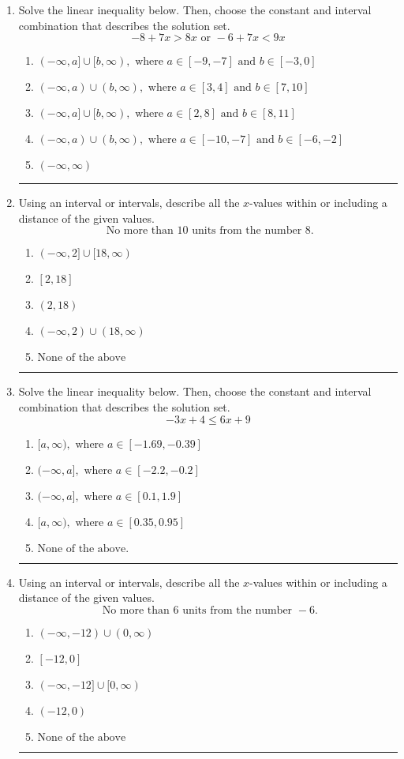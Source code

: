 \documentclass[14pt]{extbook}
\newcommand{\litem}[1]{\item#1\hspace*{-1cm}\rule{\textwidth}{0.4pt}}
\begin{document}
\begin{enumerate}
\litem{
Solve the linear inequality below. Then, choose the constant and interval combination that describes the solution set.\[ -8 + 7 x > 8 x \text{ or } -6 + 7 x < 9 x \]\begin{enumerate}[label=\Alph*.]
\item \( (-\infty, a] \cup [b, \infty), \text{ where } a \in [-9, -7] \text{ and } b \in [-3, 0] \)
\item \( (-\infty, a) \cup (b, \infty), \text{ where } a \in [3, 4] \text{ and } b \in [7, 10] \)
\item \( (-\infty, a] \cup [b, \infty), \text{ where } a \in [2, 8] \text{ and } b \in [8, 11] \)
\item \( (-\infty, a) \cup (b, \infty), \text{ where } a \in [-10, -7] \text{ and } b \in [-6, -2] \)
\item \( (-\infty, \infty) \)

\end{enumerate} }
\litem{
Using an interval or intervals, describe all the $x$-values within or including a distance of the given values.\[ \text{ No more than } 10 \text{ units from the number } 8. \]\begin{enumerate}[label=\Alph*.]
\item \( (-\infty, 2] \cup [18, \infty) \)
\item \( [2, 18] \)
\item \( (2, 18) \)
\item \( (-\infty, 2) \cup (18, \infty) \)
\item \( \text{None of the above} \)

\end{enumerate} }
\litem{
Solve the linear inequality below. Then, choose the constant and interval combination that describes the solution set.\[ -3x + 4 \leq 6x + 9 \]\begin{enumerate}[label=\Alph*.]
\item \( [a, \infty), \text{ where } a \in [-1.69, -0.39] \)
\item \( (-\infty, a], \text{ where } a \in [-2.2, -0.2] \)
\item \( (-\infty, a], \text{ where } a \in [0.1, 1.9] \)
\item \( [a, \infty), \text{ where } a \in [0.35, 0.95] \)
\item \( \text{None of the above}. \)

\end{enumerate} }
\litem{
Using an interval or intervals, describe all the $x$-values within or including a distance of the given values.\[ \text{ No more than } 6 \text{ units from the number } -6. \]\begin{enumerate}[label=\Alph*.]
\item \( (-\infty, -12) \cup (0, \infty) \)
\item \( [-12, 0] \)
\item \( (-\infty, -12] \cup [0, \infty) \)
\item \( (-12, 0) \)
\item \( \text{None of the above} \)


\end{enumerate}}
\end{enumerate}
\end{document}
